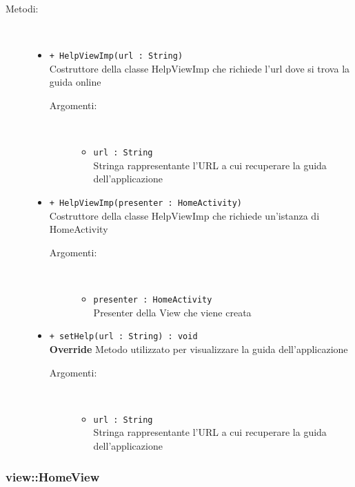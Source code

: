 \documentclass[../DefinizioneDiProdotto.tex]{subfiles}
\begin{document}
\begin{description}
\begin{itemize}
\end{itemize}
\item[Metodi:] \
\begin{itemize}
\item \texttt{+ HelpViewImp(url : String)}\\
Costruttore della classe HelpViewImp che richiede l'url dove si trova la guida online
 \begin{description}
\item[Argomenti:] \
\begin{itemize}
\item \texttt{url : String}\\
Stringa rappresentante l'URL a cui recuperare la guida dell'applicazione\end{itemize}
\end{description}
\item \texttt{+ HelpViewImp(presenter : HomeActivity)}\\
Costruttore della classe HelpViewImp che richiede un'istanza di HomeActivity
 \begin{description}
\item[Argomenti:] \
\begin{itemize}
\item \texttt{presenter : HomeActivity}\\
Presenter della View che viene creata\end{itemize}
\end{description}
\item \texttt{+ setHelp(url : String) : void}\\
\textbf{Override} Metodo utilizzato per visualizzare la guida dell'applicazione
 \begin{description}
\item[Argomenti:] \
\begin{itemize}
\item \texttt{url : String}\\
Stringa rappresentante l'URL a cui recuperare la guida dell'applicazione\end{itemize}
\end{description}
\end{itemize}
\end{description}

\subsubsection{view::HomeView}
\end{document}
